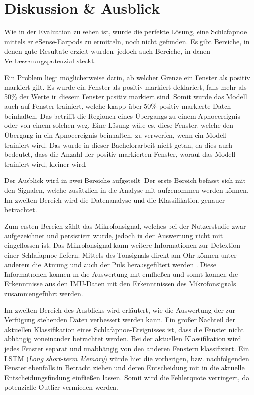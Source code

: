 
\chapter{Diskussion \& Ausblick}
\label{ch:FutureWork}
%

Wie in der Evaluation zu sehen ist, wurde die perfekte Lösung, eine Schlafapnoe mittels er eSense-Earpods zu ermitteln, noch nicht gefunden.
Es gibt Bereiche, in denen gute Resultate erzielt wurden, jedoch auch Bereiche, in denen Verbesserungspotenzial steckt. 

Ein Problem liegt möglicherweise darin, ab welcher Grenze ein Fenster als positiv markiert gilt.
Es wurde ein Fenster als positiv markiert deklariert, falls mehr als 50\% der Werte in diesem Fenster positiv markiert sind.
Somit wurde das Modell auch auf Fenster trainiert, welche knapp über 50\% positiv markierte Daten beinhalten.
Das betrifft die Regionen eines Übergangs zu einem Apnoeereignis oder von einem solchen weg.
Eine Lösung wäre es, diese Fenster, welche den Übergang in ein Apnoeereignis beinhalten, zu verwerfen, wenn ein Modell trainiert wird. 
Das wurde in dieser Bachelorarbeit nicht getan, da dies auch bedeutet, dass die Anzahl der positiv markierten Fenster, worauf das Modell trainiert wird, kleiner wird.

Der Ausblick wird in zwei Bereiche aufgeteilt.
Der erste Bereich befasst sich mit den Signalen, welche zusätzlich in die Analyse mit aufgenommen werden können.
Im zweiten Bereich wird die Datenanalyse und die Klassifikation genauer betrachtet.

Zum ersten Bereich zählt das Mikrofonsignal, welches bei der Nutzerstudie zwar aufgezeichnet und persistiert wurde, jedoch in der Auswertung nicht mit eingeflossen ist. 
Das Mikrofonsignal kann weitere Informationen zur Detektion einer Schlafapnoe liefern. 
Mittels des Tonsignals direkt am Ohr können unter anderem die Atmung und auch der Puls herausgefiltert werden \cite{nomaWearableDataAcquisition2005}.
Diese Informationen können in die Auswertung mit einfließen und somit können die Erkenntnisse aus den IMU-Daten mit den Erkenntnissen des Mikrofonsignals zusammengeführt werden.

Im zweiten Bereich des Ausblicks wird erläutert, wie die Auswertung der zur Verfügung stehenden Daten verbessert werden kann.
Ein großer Nachteil der aktuellen Klassifikation eines Schlafapnoe-Ereignisses ist, dass die Fenster nicht abhängig voneinander betrachtet werden.
Bei der aktuellen Klassifikation wird jedes Fenster separat und unabhängig von den anderen Fenstern klassifiziert.
Ein LSTM (\textit{Long short-term Memory}) würde hier die vorherigen, bzw. nachfolgenden Fenster ebenfalls in Betracht ziehen und deren Entscheidung mit in die aktuelle Entscheidungsfindung einfließen lassen. 
Somit wird die Fehlerquote verringert, da potenzielle Outlier vermieden werden.

